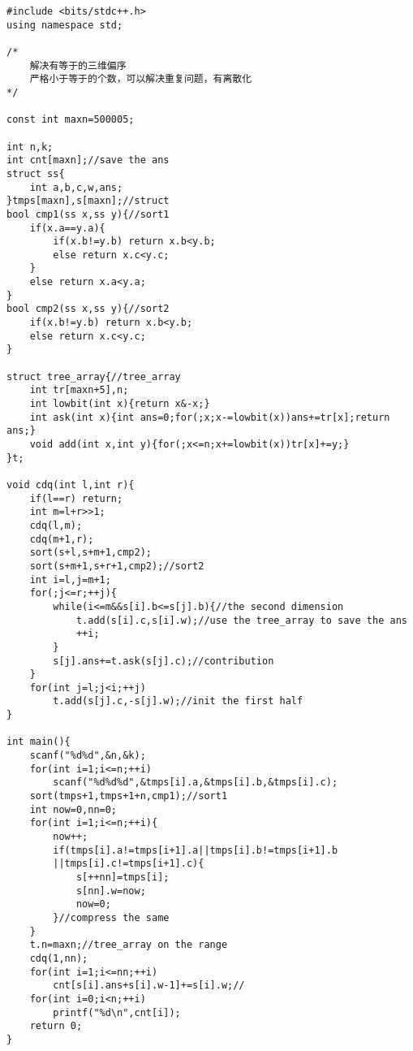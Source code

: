 \begin{lstlisting}
#include <bits/stdc++.h>
using namespace std;

/*
    解决有等于的三维偏序
	严格小于等于的个数，可以解决重复问题，有离散化
*/

const int maxn=500005;

int n,k;
int cnt[maxn];//save the ans
struct ss{
	int a,b,c,w,ans;
}tmps[maxn],s[maxn];//struct
bool cmp1(ss x,ss y){//sort1
	if(x.a==y.a){
		if(x.b!=y.b) return x.b<y.b;
		else return x.c<y.c;
	}
	else return x.a<y.a;
}
bool cmp2(ss x,ss y){//sort2
	if(x.b!=y.b) return x.b<y.b;
	else return x.c<y.c;
}

struct tree_array{//tree_array
	int tr[maxn+5],n;
	int lowbit(int x){return x&-x;}
	int ask(int x){int ans=0;for(;x;x-=lowbit(x))ans+=tr[x];return ans;}
	void add(int x,int y){for(;x<=n;x+=lowbit(x))tr[x]+=y;}	
}t;

void cdq(int l,int r){
	if(l==r) return;
	int m=l+r>>1;
	cdq(l,m);
	cdq(m+1,r);
	sort(s+l,s+m+1,cmp2);
	sort(s+m+1,s+r+1,cmp2);//sort2
	int i=l,j=m+1;
	for(;j<=r;++j){
		while(i<=m&&s[i].b<=s[j].b){//the second dimension
			t.add(s[i].c,s[i].w);//use the tree_array to save the ans
			++i;
		}
		s[j].ans+=t.ask(s[j].c);//contribution
	}
	for(int j=l;j<i;++j)
		t.add(s[j].c,-s[j].w);//init the first half
}

int main(){
	scanf("%d%d",&n,&k);
	for(int i=1;i<=n;++i)
		scanf("%d%d%d",&tmps[i].a,&tmps[i].b,&tmps[i].c);
	sort(tmps+1,tmps+1+n,cmp1);//sort1
	int now=0,nn=0;
	for(int i=1;i<=n;++i){
		now++;
		if(tmps[i].a!=tmps[i+1].a||tmps[i].b!=tmps[i+1].b
		||tmps[i].c!=tmps[i+1].c){
			s[++nn]=tmps[i];
			s[nn].w=now;
			now=0;
		}//compress the same
	}
	t.n=maxn;//tree_array on the range
	cdq(1,nn);
	for(int i=1;i<=nn;++i)
		cnt[s[i].ans+s[i].w-1]+=s[i].w;//
	for(int i=0;i<n;++i)
		printf("%d\n",cnt[i]);
	return 0;
}
\end{lstlisting}